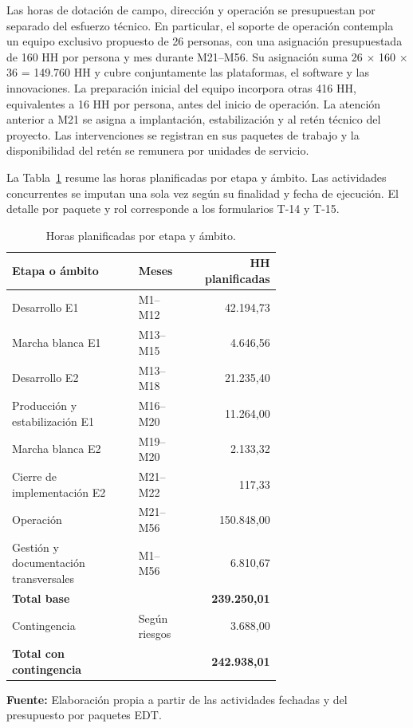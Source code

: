 \documentclass[11pt]{article}
\begin{document}
Las horas de dotación de campo, dirección y operación se presupuestan por separado del esfuerzo técnico. En particular, el soporte de operación contempla un equipo exclusivo propuesto de 26 personas, con una asignación presupuestada de 160 HH por persona y mes durante M21–M56. Su asignación suma 26 \(\times\) 160 \(\times\) 36 = 149.760 HH y cubre conjuntamente las plataformas, el software y las innovaciones. La preparación inicial del equipo incorpora otras 416 HH, equivalentes a 16 HH por persona, antes del inicio de operación. La atención anterior a M21 se asigna a implantación, estabilización y al retén técnico del proyecto. Las intervenciones se registran en sus paquetes de trabajo y la disponibilidad del retén se remunera por unidades de servicio.

La Tabla~\ref{tab:7-2} resume las horas planificadas por etapa y ámbito. Las actividades concurrentes se imputan una sola vez según su finalidad y fecha de ejecución. El detalle por paquete y rol corresponde a los formularios T-14 y T-15.


\begin{longtable}{p{0.47\linewidth}p{0.20\linewidth}r}
\caption{Horas planificadas por etapa y ámbito.}\label{tab:7-2}\\
\toprule
\textbf{Etapa o ámbito} & \textbf{Meses} & \textbf{HH planificadas} \\
\midrule
\endhead
\bottomrule
\endlastfoot
Desarrollo E1 & M1–M12 & 42.194,73 \\
Marcha blanca E1 & M13–M15 & 4.646,56 \\
Desarrollo E2 & M13–M18 & 21.235,40 \\
Producción y estabilización E1 & M16–M20 & 11.264,00 \\
Marcha blanca E2 & M19–M20 & 2.133,32 \\
Cierre de implementación E2 & M21–M22 & 117,33 \\
Operación & M21–M56 & 150.848,00 \\
Gestión y documentación transversales & M1–M56 & 6.810,67 \\
\textbf{Total base} & & \textbf{239.250,01} \\
Contingencia & Según riesgos & 3.688,00 \\
\textbf{Total con contingencia} & & \textbf{242.938,01} \\
\end{longtable}

\textbf{Fuente:} Elaboración propia a partir de las actividades fechadas y del presupuesto por paquetes EDT.
\end{document}
